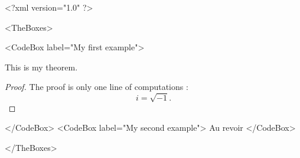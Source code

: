 <?xml version="1.0" ?>

<TheBoxes>

<CodeBox label="My first example">
	
\begin{proposition}
	This is my theorem.
\end{proposition}

\begin{proof}
	The proof is only one line of computations :
	\begin{equation}
		i=\sqrt{-1}.
	\end{equation}
\end{proof}

</CodeBox>
<CodeBox label="My second example">
	Au revoir
</CodeBox>

</TheBoxes>
